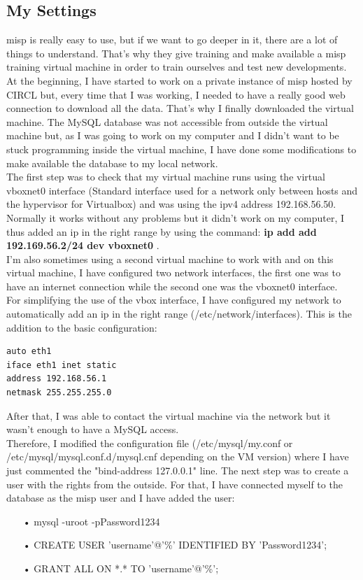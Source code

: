 \documentclass{eplmastersthesis}
\begin{document}
\subsection{My Settings}

\gls{misp} is really easy to use, but if we want to go deeper in it, there are a lot of things to understand. That's why they give training and make available a \gls{misp} training virtual machine in order to train ourselves and test new developments.\\
At the beginning, I have started to work on a private instance of \gls{misp} hosted by CIRCL but, every time that I was working, I needed to have a really good web connection to download all the data. That's why I finally downloaded the virtual machine. 
The MySQL database was not accessible from outside the virtual machine but, as I was going to work on my computer and I didn't want to be stuck programming inside the virtual machine, I have done some modifications to make available the database to my local network.\\
The first step was to check that my virtual machine runs using the virtual vboxnet0 interface (Standard interface used for a network only between hosts and the hypervisor for Virtualbox) and was using the \gls{ipv4} address 192.168.56.50. Normally it works without any problems but it didn't work on my computer, I thus added an \gls{ip} in the right range by using the command:
\textbf{ip add add 192.169.56.2/24 dev vboxnet0} .\\
I'm also sometimes using a second virtual machine to work with and on this virtual machine, I have configured two network interfaces, the first one was to have an internet connection while the second one was the vboxnet0 interface.\\
For simplifying the use of the vbox interface, I have configured my network to automatically add an \gls{ip} in the right range (/etc/network/interfaces). This is the addition to the basic configuration:
\begin{verbatim}
auto eth1
iface eth1 inet static
address 192.168.56.1
netmask 255.255.255.0
\end{verbatim}
 
After that, I was able to contact the virtual machine via the network but it wasn't enough to have a MySQL access. \\
Therefore, I modified the configuration file (/etc/mysql/my.conf or /etc/mysql/mysql.conf.d/mysql.cnf depending on the VM version) where I have just commented the "bind-address 127.0.0.1" line.
The next step was to create a user with the rights from the outside. For that, I have connected myself to the database as the \gls{misp} user and I have added the user:
\begin{itemize}
\item[•] mysql -uroot -pPassword1234 
\item[•] CREATE USER 'username'@'\%' IDENTIFIED BY 'Password1234';
\item[•] GRANT ALL ON *.* TO 'username'@'\%';
\end{itemize}
\end{document}
